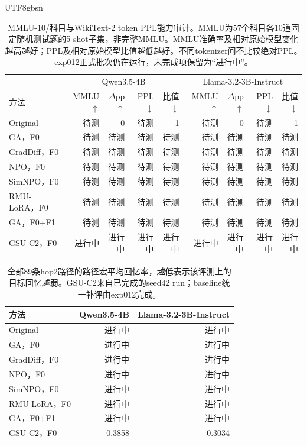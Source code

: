\documentclass[sigconf,anonymous,review]{acmart}
\begin{document}
\begin{CJK*}{UTF8}{gbsn}
\begin{table}[t]
\caption{MMLU-10/科目与WikiText-2 token PPL能力审计。MMLU为57个科目各10道固定随机测试题的5-shot子集，非完整MMLU。MMLU准确率及相对原始模型变化越高越好；PPL及相对原始模型比值越低越好。不同tokenizer间不比较绝对PPL。exp012正式批次仍在运行，未完成项保留为“进行中”。}
\label{tab:capability}
\centering\small
\begin{tabular}{lrrrrrrrr}
\toprule
 & \multicolumn{4}{c}{Qwen3.5-4B} & \multicolumn{4}{c}{Llama-3.2-3B-Instruct}\\
方法 & MMLU$\uparrow$ & $\Delta$pp$\uparrow$ & PPL$\downarrow$ & 比值$\downarrow$ & MMLU$\uparrow$ & $\Delta$pp$\uparrow$ & PPL$\downarrow$ & 比值$\downarrow$\\
\midrule
Original & 待测 & 0 & 待测 & 1 & 待测 & 0 & 待测 & 1\\
GA，F0 & 待测 & 待测 & 待测 & 待测 & 待测 & 待测 & 待测 & 待测\\
GradDiff，F0 & 待测 & 待测 & 待测 & 待测 & 待测 & 待测 & 待测 & 待测\\
NPO，F0 & 待测 & 待测 & 待测 & 待测 & 待测 & 待测 & 待测 & 待测\\
SimNPO，F0 & 待测 & 待测 & 待测 & 待测 & 待测 & 待测 & 待测 & 待测\\
RMU-LoRA，F0 & 待测 & 待测 & 待测 & 待测 & 待测 & 待测 & 待测 & 待测\\
GA，F0+F1 & 待测 & 待测 & 待测 & 待测 & 待测 & 待测 & 待测 & 待测\\
GSU-C2，F0 & 进行中 & 进行中 & 进行中 & 进行中 & 进行中 & 进行中 & 进行中 & 进行中\\
\bottomrule
\end{tabular}
\end{table}

\begin{table}[t]
\caption{全部89条hop2路径的路径宏平均回忆率，越低表示该评测上的目标回忆越弱。GSU-C2来自已完成的seed42 run；baseline统一补评由exp012完成。}
\label{tab:allhop2pilot}
\centering\small
\begin{tabular}{lrr}
\toprule
方法 & Qwen3.5-4B & Llama-3.2-3B-Instruct\\
\midrule
Original & 进行中 & 进行中\\
GA，F0 & 进行中 & 进行中\\
GradDiff，F0 & 进行中 & 进行中\\
NPO，F0 & 进行中 & 进行中\\
SimNPO，F0 & 进行中 & 进行中\\
RMU-LoRA，F0 & 进行中 & 进行中\\
GA，F0+F1 & 进行中 & 进行中\\
GSU-C2，F0 & 0.3858 & 0.3034\\
\bottomrule
\end{tabular}
\end{table}


\end{CJK*}
\end{document}
